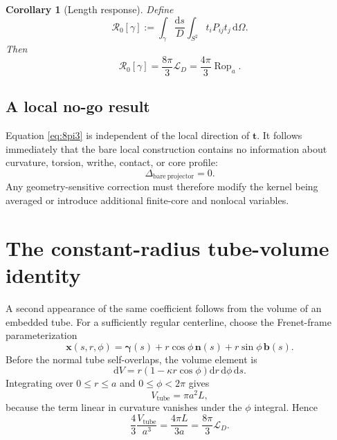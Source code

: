 \documentclass[aps,pre,preprint,notitlepage,nofootinbib,superscriptaddress]{revtex4-2}
\newcommand{\dd}{\mathrm d}
\newcommand{\Rop}{\operatorname{Rop}}
\newcommand{\calL}{\mathcal L}
\newcommand{\Rgeom}{\mathscr R_{0}}
\newtheorem{corollary}{Corollary}
\begin{document}
\begin{corollary}[Length response]
Define
\begin{equation}
  \Rgeom[\gamma]
  :=\int_\gamma\frac{\dd s}{D}
     \int_{S^2}t_iP_{ij}t_j\,\dd\Omega.
\end{equation}
Then
\begin{equation}
  \boxed{
  \Rgeom[\gamma]=\frac{8\pi}{3}\calL_D
  =\frac{4\pi}{3}\Rop_a.}
  \label{eq:leading-response}
\end{equation}
\end{corollary}

\subsection{A local no-go result}

Equation \eqref{eq:8pi3} is independent of the local direction of $\bm t$.  It follows immediately that the bare local construction contains no information about curvature, torsion, writhe, contact, or core profile:
\begin{equation}
  \boxed{\Delta_{\mathrm{bare\ projector}}=0.}
  \label{eq:projector-no-go}
\end{equation}
Any geometry-sensitive correction must therefore modify the kernel being averaged or introduce additional finite-core and nonlocal variables.

\section{The constant-radius tube-volume identity}
\label{sec:tube-volume}

A second appearance of the same coefficient follows from the volume of an embedded tube.  For a sufficiently regular centerline, choose the Frenet-frame parameterization
\begin{equation}
  \bm x(s,r,\phi)=\bm\gamma(s)
  +r\cos\phi\,\bm n(s)+r\sin\phi\,\bm b(s).
\end{equation}
Before the normal tube self-overlaps, the volume element is
\begin{equation}
  \dd V=r\left(1-\kappa r\cos\phi\right)
  \dd r\,\dd\phi\,\dd s.
  \label{eq:tube-jacobian}
\end{equation}
Integrating over $0\le r\le a$ and $0\le\phi<2\pi$ gives
\begin{equation}
  V_{\mathrm{tube}}=\pi a^2L,
  \label{eq:tube-volume}
\end{equation}
because the term linear in curvature vanishes under the $\phi$ integral.  Hence
\begin{equation}
  \boxed{
  \frac{4}{3}\frac{V_{\mathrm{tube}}}{a^3}
  =\frac{4\pi L}{3a}
  =\frac{8\pi}{3}\calL_D.}
  \label{eq:tube-volume-identity}
\end{equation}
\end{document}
